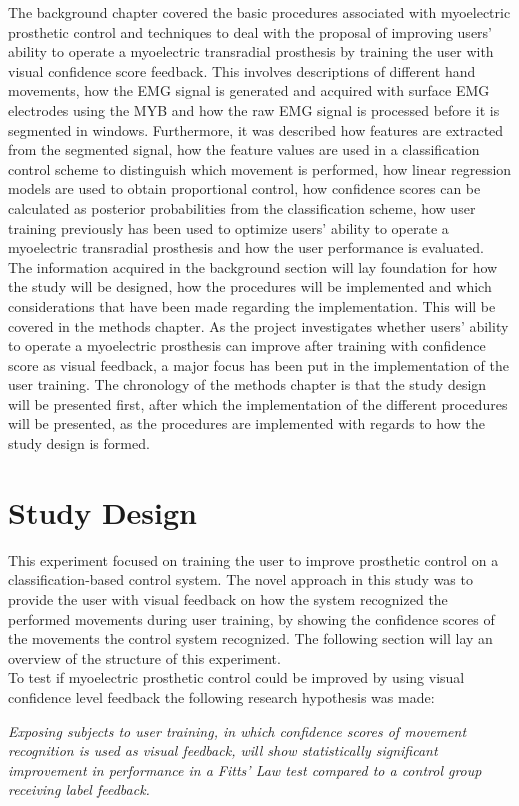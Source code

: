 The background chapter covered the basic procedures associated with myoelectric prosthetic control and techniques to deal with the proposal of improving users' ability to operate a myoelectric transradial prosthesis by training the user with visual confidence score feedback. This involves descriptions of different hand movements, how the EMG signal is generated and acquired with surface EMG electrodes using the MYB and how the raw EMG signal is processed before it is segmented in windows. Furthermore, it was described how features are extracted from the segmented signal, how the feature values are used in a classification control scheme to distinguish which movement is performed, how linear regression models are used to obtain proportional control, how confidence scores can be calculated as posterior probabilities from the classification scheme, how user training previously has been used to optimize users' ability to operate a myoelectric transradial prosthesis and how the user performance is evaluated. \\
The information acquired in the background section will lay foundation for how the study will be designed, how the procedures will be implemented and which considerations that have been made regarding the implementation. This will be covered in the methods chapter. As the project investigates whether users' ability to operate a myoelectric prosthesis can improve after training with confidence score as visual feedback, a major focus has been put in the implementation of the user training. The chronology of the methods chapter is that the study design will be presented first, after which the implementation of the different procedures will be presented, as the procedures are implemented with regards to how the study design is formed. 

\section{Study Design} \label{sec:M:studyDesign}

This experiment focused on training the user to improve prosthetic control on a classification-based control system. The novel approach in this study was to provide the user with visual feedback on how the system recognized the performed movements during user training, by showing the confidence scores of the movements the control system recognized. The following section will lay an overview of the structure of this experiment. \\
To test if myoelectric prosthetic control could be improved by using visual confidence level feedback the following research hypothesis was made: 
\begin{center}
	\textit{Exposing subjects to user training, in which confidence scores of movement recognition is used as visual feedback, will show statistically significant improvement in performance in a Fitts' Law test compared to a control group receiving label feedback.}
\end{center}


